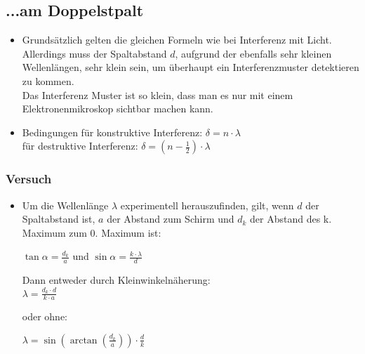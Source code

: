 \subsection{...am Doppelstpalt}
\begin{itemize}
\item Grundsätzlich gelten die gleichen Formeln wie bei Interferenz mit Licht. Allerdings muss der Spaltabstand $d$, aufgrund der ebenfalls sehr kleinen Wellenlängen, sehr klein sein, um überhaupt ein Interferenzmuster detektieren zu kommen.\\
Das Interferenz Muster ist so klein, dass man es nur mit einem Elektronenmikroskop sichtbar machen kann.
\item Bedingungen für konstruktive Interferenz: $\delta = n \cdot \lambda$\\
für destruktive Interferenz: $\delta = (n-\frac{1}{2}) \cdot \lambda$
\end{itemize}

\subsubsection{Versuch}
\begin{itemize}
\item Um die Wellenlänge $\lambda$ experimentell herauszufinden, gilt, wenn $d$ der Spaltabstand ist, $a$ der Abstand zum Schirm und $d_k$ der Abstand des k. Maximum zum 0. Maximum ist:

$\tan{\alpha}=\frac{d_k}{a}$ und $\sin{\alpha}=\frac{k \cdot\lambda}{d}$

Dann entweder durch Kleinwinkelnäherung:\\
\Large $\lambda = \frac{d_k \cdot d}{k \cdot a}$

\normalsize oder ohne:

\Large $\lambda = \sin(\arctan(\frac{d_k}{a})) \cdot \frac{d}{k}$
\end{itemize}